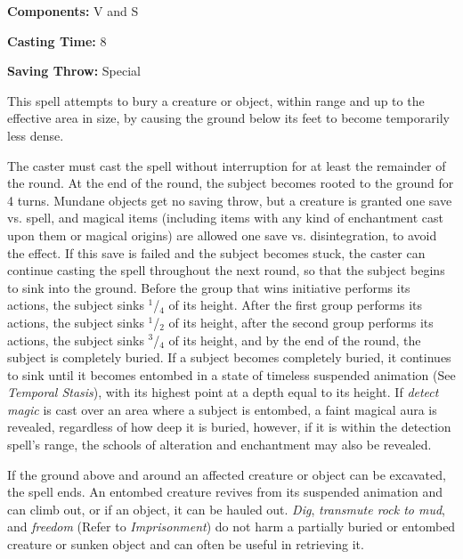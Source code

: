 \begin{multicols}{2}
\begin{minipage}{\columnwidth}
\noindent \textbf{Components:} V and S

\noindent \textbf{Casting Time:} 8

\noindent \textbf{Saving Throw:} Special

\end{minipage}

This spell attempts to bury a creature or object, within range and up to the effective area in size, by causing the ground below its feet to become temporarily less dense.  

The caster must cast the spell without interruption for at least the remainder of the round.  At the end of the round, the subject becomes rooted to the ground for 4 turns.  Mundane objects get no saving throw, but a creature is granted one save vs. spell, and magical items (including items with any kind of enchantment cast upon them or magical origins) are allowed one save vs. disintegration, to avoid the effect.  If this save is failed and the subject becomes stuck, the caster can continue casting the spell throughout the next round, so that the subject begins to sink into the ground.  Before the group that wins initiative performs its actions, the subject sinks $^1$/$_4$ of its height.  After the first group performs its actions, the subject sinks $^1$/$_2$ of its height, after the second group performs its actions, the subject sinks $^3$/$_4$ of its height, and by the end of the round, the subject is completely buried.
If a subject becomes completely buried, it continues to sink until it becomes entombed in a state of timeless suspended animation (See \textit{Temporal Stasis}), with its highest point at a depth equal to its height.  If \textit{detect magic} is cast over an area where a subject is entombed, a faint magical aura is revealed, regardless of how deep it is buried, however, if it is within the detection spell's range, the schools of alteration and enchantment may also be revealed.

If the ground above and around an affected creature or object can be excavated, the spell ends.  An entombed creature revives from its suspended animation and can climb out, or if an object, it can be hauled out.  \textit{Dig}, \textit{transmute rock to mud}, and \textit{freedom} (Refer to \textit{Imprisonment}) do not harm a partially buried or entombed creature or sunken object and can often be useful in retrieving it.

\vspace{1em}

\noindent
\begin{minipage}{\columnwidth}


\end{minipage}
\end{multicols}
